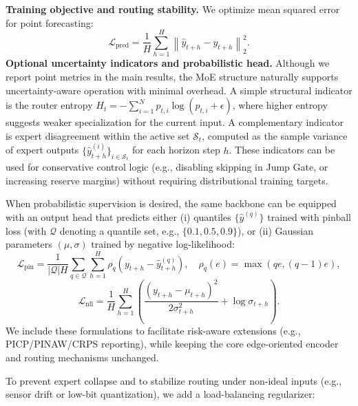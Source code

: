 \documentclass[review,3p,times]{elsarticle}
\begin{document}
\noindent\textbf{Training objective and routing stability.}\label{sec:objective}
We optimize mean squared error for point forecasting:
\begin{equation}
\mathcal{L}_{\text{pred}} = \frac{1}{H}\sum_{h=1}^{H}\left\|\hat{y}_{t+h}-y_{t+h}\right\|_2^2.
\end{equation}
\noindent\textbf{Optional uncertainty indicators and probabilistic head.}
Although we report point metrics in the main results, the MoE structure naturally supports uncertainty-aware operation with minimal overhead. 
A simple structural indicator is the router entropy $H_t=-\sum_{i=1}^{N}p_{t,i}\log(p_{t,i}+\epsilon)$, where higher entropy suggests weaker specialization for the current input.
A complementary indicator is expert disagreement within the active set $\mathcal{S}_t$, computed as the sample variance of expert outputs $\{\hat{y}^{(i)}_{t+h}\}_{i\in\mathcal{S}_t}$ for each horizon step $h$.
These indicators can be used for conservative control logic (e.g., disabling skipping in Jump Gate, or increasing reserve margins) without requiring distributional training targets.

When probabilistic supervision is desired, the same backbone can be equipped with an output head that predicts either (i) quantiles $\{\hat{y}^{(q)}\}$ trained with pinball loss (with $\mathcal{Q}$ denoting a quantile set, e.g., $\{0.1,0.5,0.9\}$), or (ii) Gaussian parameters $(\mu,\sigma)$ trained by negative log-likelihood:
\begin{equation}
\mathcal{L}_{\text{pin}}=\frac{1}{|\mathcal{Q}|H}\sum_{q\in\mathcal{Q}}\sum_{h=1}^{H}\rho_q\!\left(y_{t+h}-\hat{y}^{(q)}_{t+h}\right),\quad
\rho_q(e)=\max(qe,(q-1)e),
\end{equation}
\begin{equation}
\mathcal{L}_{\text{nll}}=\frac{1}{H}\sum_{h=1}^{H}\left(\frac{(y_{t+h}-\mu_{t+h})^2}{2\sigma_{t+h}^2}+\log\sigma_{t+h}\right).
\end{equation}
We include these formulations to facilitate risk-aware extensions (e.g., PICP/PINAW/CRPS reporting), while keeping the core edge-oriented encoder and routing mechanisms unchanged.

To prevent expert collapse and to stabilize routing under non-ideal inputs (e.g., sensor drift or low-bit quantization), we add a load-balancing regularizer:
\end{document}

